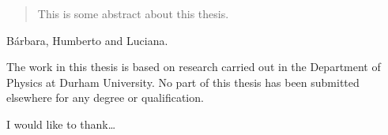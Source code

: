 \documentclass[twoside,openright,frontopenright]{ip3thesis}
\begin{document}
\title{}
\subtitle{}
\author{Matheus Hostert}
\maketitlepage*

\begin{abstract}
%
	This is some abstract about this thesis.
%
\end{abstract}


\begin{dedication*}
%
B\'arbara, Humberto and Luciana.
%
\end{dedication*}

\disableprotrusion
\tableofcontents*
\listoffigures
\listoftables
\enableprotrusion

\begin{declaration*}
%
	The work in this thesis is based on research carried out in the Department of
	Physics at Durham University. No part of this thesis has been
	submitted elsewhere for any degree or qualification.
%
\end{declaration*}

\begin{acknowledgements*}
%
	I would like to thank\ldots
%
\end{acknowledgements*}



\cleardoublepage
\end{document}
